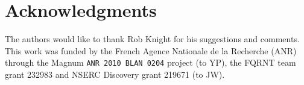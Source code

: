 \section{Acknowledgments}
\label{sec:acknowledgments}
The authors would like to thank Rob Knight for his suggestions and comments.
This work was funded by the French Agence Nationale de la Recherche (ANR) through the {\sc Magnum} {\tt ANR 2010 BLAN 0204} 
project (to YP), the FQRNT team grant 232983 and NSERC Discovery grant 219671 (to JW).